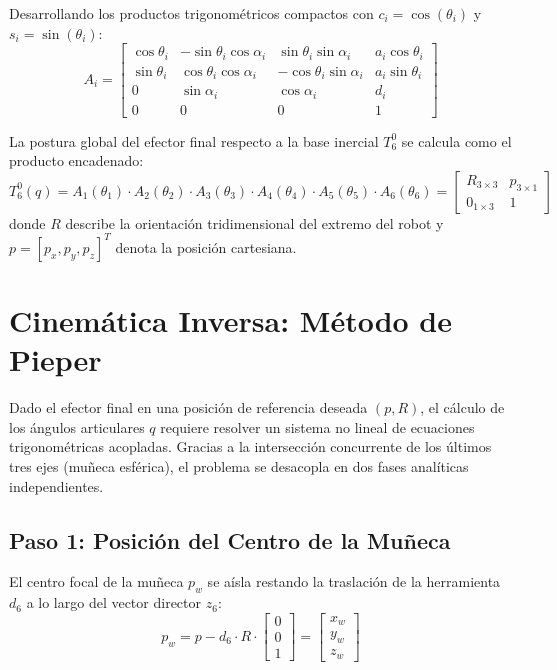 \documentclass[11pt,a4paper]{article}
\begin{document}
Desarrollando los productos trigonométricos compactos con $c_i = \cos(\theta_i)$ y $s_i = \sin(\theta_i)$:
\begin{equation}
A_i = \begin{bmatrix}
\cos\theta_i & -\sin\theta_i \cos\alpha_i & \sin\theta_i \sin\alpha_i & a_i \cos\theta_i \\
\sin\theta_i & \cos\theta_i \cos\alpha_i & -\cos\theta_i \sin\alpha_i & a_i \sin\theta_i \\
0 & \sin\alpha_i & \cos\alpha_i & d_i \\
0 & 0 & 0 & 1
\end{bmatrix}
\end{equation}

La postura global del efector final respecto a la base inercial $T_6^0$ se calcula como el producto encadenado:
\begin{equation}
T_6^0(q) = A_1(\theta_1) \cdot A_2(\theta_2) \cdot A_3(\theta_3) \cdot A_4(\theta_4) \cdot A_5(\theta_5) \cdot A_6(\theta_6) = \begin{bmatrix}
R_{3\times3} & p_{3\times1} \\
0_{1\times3} & 1
\end{bmatrix}
\end{equation}
donde $R$ describe la orientación tridimensional del extremo del robot y $p = [p_x, p_y, p_z]^T$ denota la posición cartesiana.

\section{Cinemática Inversa: Método de Pieper}
Dado el efector final en una posición de referencia deseada $(p, R)$, el cálculo de los ángulos articulares $q$ requiere resolver un sistema no lineal de ecuaciones trigonométricas acopladas. Gracias a la intersección concurrente de los últimos tres ejes (muñeca esférica), el problema se desacopla en dos fases analíticas independientes.

\subsection{Paso 1: Posición del Centro de la Muñeca}
El centro focal de la muñeca $p_w$ se aísla restando la traslación de la herramienta $d_6$ a lo largo del vector director $z_6$:
\begin{equation}
p_w = p - d_6 \cdot R \cdot \begin{bmatrix} 0 \\ 0 \\ 1 \end{bmatrix} = \begin{bmatrix} x_w \\ y_w \\ z_w \end{bmatrix}
\end{equation}
\end{document}
